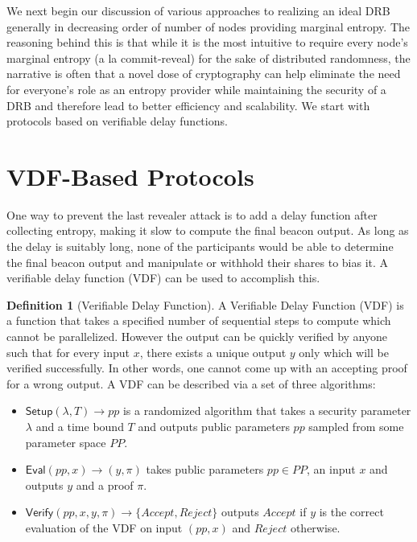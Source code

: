\documentclass[letterpaper,twocolumn,10pt]{article}
\theoremstyle{definition}
\newtheorem{definition}[theorem]{Definition}
\theoremstyle{remark}
\begin{document}
We next begin our discussion of various approaches to realizing an ideal DRB generally in decreasing order of number of nodes providing marginal entropy. The reasoning behind this is that while it is the most intuitive to require every node's marginal entropy (a la commit-reveal) for the sake of distributed randomness, the narrative is often that a novel dose of cryptography can help eliminate the need for everyone's role as an entropy provider while maintaining the security of a DRB and therefore lead to better efficiency and scalability. We start with protocols based on verifiable delay functions.

\section{VDF-Based Protocols}
\label{section:vdf}
One way to prevent the last revealer attack is to add a delay function after collecting entropy, making it slow to compute the final beacon output. As long as the delay is suitably long, none of the participants would be able to determine the final beacon output and manipulate or withhold their shares to bias it. A verifiable delay function (VDF) \cite{boneh2018verifiable} can be used to accomplish this.
\begin{definition}[Verifiable Delay Function]
A Verifiable Delay Function (VDF) is a function that takes a specified number of sequential steps to compute which cannot be parallelized. However the output can be quickly verified by anyone such that for every input $x$, there exists a unique output $y$ only which will be verified successfully. In other words, one cannot come up with an accepting proof for a wrong output.
A VDF can be described via a set of three algorithms:
\begin{itemize}
\item $\mathsf{Setup}(\lambda, T) \rightarrow pp$ is a randomized algorithm that takes a security parameter $\lambda$ and a time bound $T$ and outputs public parameters $pp$ sampled from some parameter space $PP$.
\item $\mathsf{Eval}(pp, x) \rightarrow (y, \pi)$ takes public parameters $pp\in PP$, an input $x$ and outputs $y$ and a proof $\pi$.
\item $\mathsf{Verify}(pp, x, y, \pi) \rightarrow \{Accept, Reject\}$ outputs $Accept$ if $y$ is the correct evaluation of the VDF on input $(pp, x)$ and $Reject$ otherwise.
\end{itemize}
\end{definition}
\end{document}
